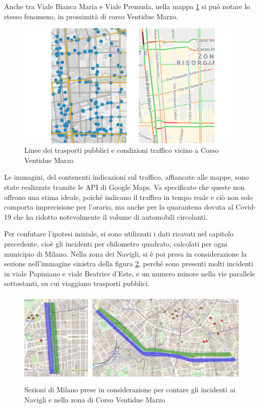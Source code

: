 \documentclass[a4paper,12pt]{report}
\begin{document}
Anche tra Viale Bianca Maria e Viale Premuda, nella mappa \ref{fig:22-marzo} si può 
notare lo stesso fenomeno, in prossimità di corso Ventidue Marzo. 

\begin{figure}
    \includegraphics[width=\linewidth]{../src/atm/22_marzo.png}
    \caption{Linee dei trasporti pubblici e condizioni traffico vicino a Corso Ventidue Marzo}
    \label{fig:22-marzo}
\end{figure}

Le immagini, 
del contenenti indicazioni sul traffico, affiancate alle mappe, 
sono state realizzate tramite le API di 
Google Maps. 
Va specificato che queste non offrono una stima ideale, poiché indicano 
il traffico in tempo reale e ciò non solo comporta imprecisione per l'orario, 
ma anche per 
la quarantena dovuta al Covid-19 che ha ridotto notevolmente il volume di automobili 
circolanti. 

Per confutare l'ipotesi iniziale, si sono utilizzati i dati ricavati 
nel capitolo precedente, 
cioè gli incidenti per chilometro quadrato, calcolati per ogni municipio di Milano. 
Nella zona dei Navigli, si è poi presa in considerazione la sezione 
nell'immagine sinistra 
della figura \ref{fig:zona-navigli-22marzo}, 
perché sono presenti molti incidenti in viale Papiniano e viale Beatrice d'Este, 
e un numero minore nella vie parallele sottostanti, su cui viaggiano 
trasporti pubblici. 

\begin{figure}
    \includegraphics[width=\linewidth]{img_unite/zona_navigli_22marzo.png}
    \caption{Sezioni di Milano prese in considerazione per contare gli incidenti ai Navigli e nella zona di Corso Ventidue Marzo}
    \label{fig:zona-navigli-22marzo}
\end{figure}
\end{document}
